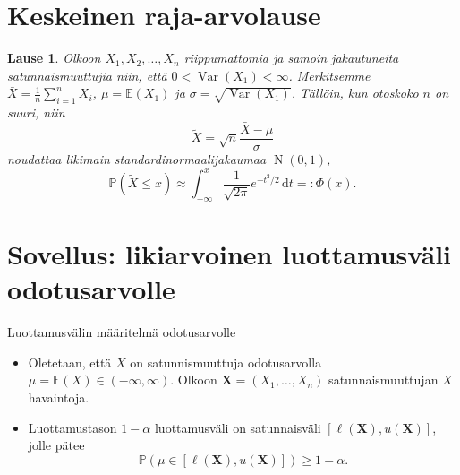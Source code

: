 \documentclass{beamer}
\newtheorem{teoreema}{Lause}
\DeclareMathOperator{\var}{Var}
\DeclareMathOperator{\n}{\mathrm N}
\begin{document}

\section{Keskeinen raja-arvolause}


\begin{frame}
  \begin{teoreema}
    Olkoon $X_1, X_2, \ldots, X_n$ riippumattomia ja samoin jakautuneita
    satunnaismuuttujia niin, että $0 < \var\left(X_1\right) < \infty$.
    Merkitsemme $\bar X = \frac{1}{n}\sum_{i = 1}^n X_i$, $\mu =
    \mathbb{E}\left(X_1\right)$ ja $\sigma = \sqrt{\var\left(X_1\right)}$.
    Tällöin, kun otoskoko $n$ on suuri, niin
    \begin{equation*}
      \tilde X = \sqrt{n}\frac{\bar X - \mu}{\sigma}
    \end{equation*}
    noudattaa likimain standardinormaalijakaumaa $\n\left(0, 1\right)$,
    \pause
    \begin{equation*}
      \mathbb{P}\left(\tilde X \leq x\right) \approx
      \int_{-\infty}^x \frac{1}{\sqrt{2\pi}}e^{-t^2/2}\,\mathrm{d}t =:
      \Phi\left(x\right).
    \end{equation*}
  \end{teoreema}
\end{frame}


\section{Sovellus: likiarvoinen luottamusväli odotusarvolle}


\begin{frame}{Luottamusvälin määritelmä odotusarvolle}
  \begin{itemize}
    \item Oletetaan, että $X$ on satunnismuuttuja odotusarvolla $\mu =
    \mathbb{E}\left(X\right)\in(-\infty, \infty)$. Olkoon $\bm X = (X_1, \ldots,
    X_n)$ satunnaismuuttujan $X$ havaintoja.
    \pause
    \item Luottamustason $1-\alpha$ luottamusväli on satunnaisväli
    $\left[\ell\left(\bm X\right), u\left(\bm X\right)\right]$, jolle pätee
    \begin{equation*}
      \mathbb{P}\left(\mu\in\left[\ell\left(\bm X\right), u\left(\bm
      X\right)\right]\right) \geq 1 - \alpha.
    \end{equation*}
  \end{itemize}
\end{frame}
\end{document}
